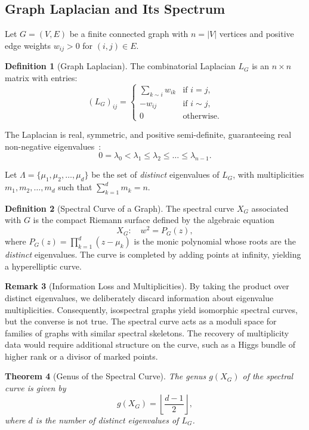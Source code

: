 \documentclass[12pt]{article}
\newtheorem{theorem}{Theorem}[section]
\theoremstyle{definition}
\newtheorem{definition}[theorem]{Definition}
\newtheorem{remark}[theorem]{Remark}
\begin{document}
\subsection{Graph Laplacian and Its Spectrum}
Let $G = (V,E)$ be a finite connected graph with $n = |V|$ vertices and positive edge weights $w_{ij} > 0$ for $(i,j) \in E$.

\begin{definition}[Graph Laplacian]
The combinatorial Laplacian $L_G$ is an $n \times n$ matrix with entries:
\[
(L_G)_{ij} = \begin{cases}
\sum_{k \sim i} w_{ik} & \text{if } i = j,\\
-w_{ij} & \text{if } i \sim j,\\
0 & \text{otherwise}.
\end{cases}
\]
\end{definition}

The Laplacian is real, symmetric, and positive semi-definite, guaranteeing real non-negative eigenvalues~\cite{Chung1997, Merris1994}:
\[
0 = \lambda_0 < \lambda_1 \le \lambda_2 \le \dots \le \lambda_{n-1}.
\]

Let $\Lambda = \{\mu_1, \mu_2, \dots, \mu_d\}$ be the set of \emph{distinct} eigenvalues of $L_G$, with multiplicities $m_1, m_2, \dots, m_d$ such that $\sum_{k=1}^{d} m_k = n$.

\begin{definition}[Spectral Curve of a Graph]
The spectral curve $X_G$ associated with $G$ is the compact Riemann surface defined by the algebraic equation
\[
X_G: \quad w^2 = P_G(z),
\]
where $P_G(z) = \prod_{k=1}^{d} (z - \mu_k)$ is the monic polynomial whose roots are the \emph{distinct} eigenvalues. The curve is completed by adding points at infinity, yielding a hyperelliptic curve.
\end{definition}

\begin{remark}[Information Loss and Multiplicities]
By taking the product over distinct eigenvalues, we deliberately discard information about eigenvalue multiplicities. Consequently, isospectral graphs yield isomorphic spectral curves, but the converse is not true. The spectral curve acts as a moduli space for families of graphs with similar spectral skeletons. The recovery of multiplicity data would require additional structure on the curve, such as a Higgs bundle of higher rank or a divisor of marked points.
\end{remark}

\begin{theorem}[Genus of the Spectral Curve]\label{thm:genus}
The genus $g(X_G)$ of the spectral curve is given by
\[
g(X_G) = \left\lfloor \frac{d-1}{2} \right\rfloor,
\]
where $d$ is the number of distinct eigenvalues of $L_G$.
\end{theorem}
\end{document}
